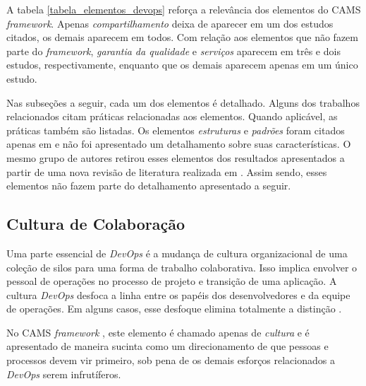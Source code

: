 A tabela \ref{tabela_elementos_devops} reforça a relevância dos elementos do
\acrshort{CAMS} \textit{framework}. Apenas \emph{compartilhamento} deixa de
aparecer em um dos estudos citados, os demais aparecem em todos. Com relação
aos elementos que não fazem parte do \textit{framework}, \emph{garantia
da qualidade} e \emph{serviços} aparecem em três e dois estudos, respectivamente,
enquanto que os demais aparecem apenas em um único estudo.

Nas subseções a seguir, cada um dos elementos é detalhado. Alguns dos trabalhos
relacionados citam práticas relacionadas aos elementos. Quando aplicável, as
práticas também são listadas. Os elementos \emph{estruturas} e \emph{padrões}
foram citados apenas em \cite{cooperation_dev_ops_esem_2014} e não foi
apresentado um detalhamento sobre suas características. O mesmo grupo de
autores retirou esses elementos dos resultados apresentados a partir de uma
nova revisão de literatura realizada em \cite{qualitative_devops_journalsw_17}.
Assim sendo, esses elementos não fazem parte do detalhamento apresentado a
seguir.

\subsection{Cultura de Colaboração}

Uma parte essencial de {\it DevOps} é a mudança de cultura organizacional de
uma coleção de silos para uma forma de trabalho colaborativa. Isso implica
envolver o pessoal de operações no processo de projeto e transição de uma
aplicação. A cultura {\it DevOps} desfoca a linha entre os papéis dos
desenvolvedores e da equipe de operações. Em alguns casos, esse desfoque
elimina totalmente a distinção \cite{challenges_in_adopting_devops}.

No \acrshort{CAMS} \textit{framework} \cite{what_devops_means_2010}, este
elemento é chamado apenas de \emph{cultura} e é apresentado de maneira sucinta
como um direcionamento de que pessoas e processos devem vir primeiro, sob pena
de os demais esforços relacionados a \textit{DevOps} serem infrutíferos.

